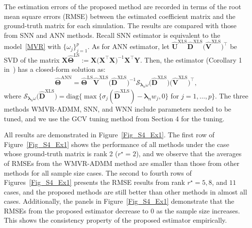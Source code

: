 \documentclass[alpha-refs]{wiley-article}
\begin{document}
The estimation errors of the proposed method are recorded in terms of the root mean square errors (RMSE) between the estimated coefficient matrix and the ground-truth matrix for each simulation. 
The results are compared with those from SNN and ANN methods. 
Recall SNN estimator is equivalent to the model~\eqref{MVR} with $\{\omega_{j}\}_{j=1}^{p}$. 
As for ANN estimator, let $\widehat{\boldsymbol{U}}^{\text{XLS}}\widehat{\boldsymbol{D}}^{\text{XLS}}\big(\widehat{\boldsymbol{V}}^{\text{XLS}}\big)^{\top}$ be SVD of the matrix $\boldsymbol{X}\widehat{\boldsymbol{\Theta}}^{\text{LS}}:=\boldsymbol{X}\big(\boldsymbol{X}^{\top}\boldsymbol{X}\big)^{-1}\boldsymbol{X}^{\top}\boldsymbol{Y}$.
Then, the estimator (Corollary 1 in~\citet{chen2013reduced}) has a closed-form solution as: 
\begin{align}
    \widehat{\boldsymbol{\Theta}}^{\text{ANN}} = \widehat{\boldsymbol{\Theta}}^{\text{LS}}
    \widehat{\boldsymbol{V}}^{\text{XLS}} \big(\widehat{\boldsymbol{D}}^{\text{XLS}}\big)^{-1}
    \mathcal{S}_{\boldsymbol{\lambda}_{n}\omega}\big(\widehat{\boldsymbol{D}}^{\text{XLS}}\big)
    \big(\widehat{\boldsymbol{V}}^{\text{XLS}}\big)^{\top},
\end{align}
where $\mathcal{S}_{\boldsymbol{\lambda}_{n}\omega}\big(\widehat{\boldsymbol{D}}^{\text{XLS}}\big)=\text{diag}\bigg\{\max\bigg\{\sigma_{j}(\widehat{\boldsymbol{D}}^{\text{XLS}})-\boldsymbol{\lambda}_{n} w_{j},0 \bigg\}$ for $j=1,\dots,p\bigg\}$. The three methods WMVR-ADMM, SNN, and WNN include parameters needed to be tuned, and we use the GCV tuning method from Section 4 for the tuning.

All results are demonstrated in Figure~\ref{Fig_S4_Ex1}. 
The first row of Figure~\ref{Fig_S4_Ex1} shows the performance of all methods under the case whose ground-truth matrix is rank 2 ($r^{\star} = 2$), and we observe that the averages of RMSEs from the WMVR-ADMM method are smaller than those from other methods for all sample size cases. 
The second to fourth rows of Figures~\ref{Fig_S4_Ex1} presents the RMSE results from rank $r^{\star} = 5, 8$, and $11$ cases, and the proposed methods are still better than other methods in almost all cases. 
Additionally, the panels in Figure~\ref{Fig_S4_Ex1} demonstrate that the RMSEs from the proposed estimator decrease to $0$ as the sample size increases.
This shows the consistency property of the proposed estimator empirically.

\end{document}
